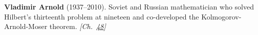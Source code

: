\textbf{Vladimir Arnold} (1937–2010). Soviet and Russian mathematician who solved Hilbert's thirteenth problem at nineteen and co-developed the Kolmogorov-Arnold-Moser theorem. \emph{[Ch.~\hyperref[ch:threebody]{48}]}


